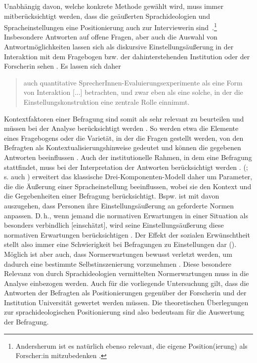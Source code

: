 Unabhängig davon, welche konkrete Methode gewählt wird, muss immer mitberücksichtigt werden, dass die ge{\"a}u{\ss}erten Sprachideologien und Spracheinstellungen eine Positionierung auch zur Interviewerin sind~\citep[s.][133]{Gal.2016}.\footnote{Andersherum ist es natürlich ebenso relevant, die eigene Position(ierung) als Forscher:in mitzubedenken \citep[s.][13]{Spitzmuller.2017b}.} 
Insbesondere Antworten auf offene Fragen, aber auch die Auswahl von Antwortmöglichkeiten lassen sich als diskursive Einstellungsäußerung in der Interaktion mit dem Fragebogen bzw. der dahinterstehenden Institution oder der Forscherin sehen \citep[s.][71]{Adler.2018}. 
Es lassen sich daher 
\begin{quote} auch quantitative SprecherInnen-Evaluierungsexperimente als eine Form von Interaktion [...] betrachten, und zwar eben als eine solche, in der die Einstellungskonstruktion eine zentrale Rolle einnimmt. \citep[145]{Soukup.2014}\end{quote} 
Kontextfaktoren einer Befragung sind somit als sehr relevant zu beurteilen und müssen bei der Analyse berücksichtigt werden \citep[s.][46]{Garrett.2012}. 
So werden etwa die Elemente eines Fragebogens oder die Varietät, in der die Fragen gestellt werden, von den Befragten als Kontextualisierungshinweise gedeutet und können die gegebenen Antworten beeinflussen \citep[s.][144]{Riehl.2000}. 
Auch der institutionelle Rahmen, in dem eine Befragung stattfindet, muss bei der Interpretation der Antworten berücksichtigt werden \citep[s.][14]{Konig.2014}. 
\citeauthor{Vandermeeren1996} (\citeyear[159]{Vandermeeren1996}; s. auch \citeyear{Vandermeeren2005}) erweitert das klassische Drei-Komponenten-Modell daher um Parameter, die die Äußerung einer Spracheinstellung beeinflussen, wobei sie den Kontext und die Gegebenheiten einer Befragung berücksichtigt. 
Bspw. ist mit \citet[208--209]{Tophinke.2006} davon auszugehen, dass Personen ihre Einstellungsäußerung an geforderte Normen anpassen. 
D.\,h., wenn jemand \glqq die normativen Erwartungen in einer Situation als besonders verbindlich [einschätzt], wird seine Einstellungsäußerung diese normativen Erwartungen berücksichtigen\grqq{} \citep[209]{Tophinke.2006}. 
Der Effekt der sozialen Erw{\"u}nschtheit stellt also immer eine Schwierigkeit bei Befragungen zu Einstellungen dar (\cites[s.][182]{Plewnia.2011}[44]{Garrett.2012}).
Möglich ist aber auch, dass Normerwartungen bewusst verletzt werden, um dadurch eine bestimmte Selbstinszenierung vorzunehmen \citep[s.][214--215]{Tophinke.2006}.
Diese besondere Relevanz von durch Sprachideologien vermittelten Normerwartungen muss in die Analyse einbezogen werden. %
Auch für die vorliegende Untersuchung gilt, dass die Antworten der Befragten als Positionierungen gegenüber der Forscherin und der Institution Universität gewertet werden müssen. 
Die theoretischen Überlegungen zur sprachideologischen Positionierung sind also bedeutsam für die Auswertung der Befragung. %

